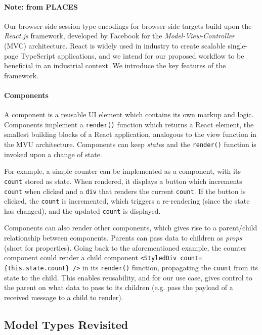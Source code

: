 \paragraph{Note: from PLACES}
Our browser-side session type encodings for browser-side targets build upon the
\emph{React.js} framework, developed by Facebook \cite{React} for the
\textit{Model-View-Controller} (MVC) architecture.
React is widely used in industry to create scalable single-page TypeScript
applications, and we intend for our proposed workflow to be beneficial in an
industrial context.
We introduce the key features of the framework.

\paragraph{Components}
A component is a reusable UI element which
contains its own markup and logic.
Components implement a \texttt{render()} function which returns a React
element, the smallest building blocks of a React application, analogous to the
view function in the MVU architecture.
Components can keep \textit{state}s and the \texttt{render()} function is
invoked upon a change of state.

For example, a simple counter can be implemented as a component,
with its \texttt{count} stored as state.
When rendered, it displays a button which increments \texttt{count}
when clicked and a \texttt{div} that renders the current
\texttt{count}.
If the button is clicked, the \texttt{count} is incremented, which triggers a
re-rendering (since the state has changed), and the updated \texttt{count} is
displayed.

Components can also render other components, which gives rise
to a parent/child relationship between components.
Parents can pass data to children as \textit{props} (short for properties).
Going back to the aforementioned example, the counter component could
render a child component \texttt{<StyledDiv count=\{this.state.count\} />} in
its \texttt{render()} function, propagating the \texttt{count} from its state
to the child.
This enables reusability, and for our use case, gives control to the parent
on what data to pass to its children (e.g. pass the payload of a received
message to a child to render).

\subsection{Model Types Revisited}
